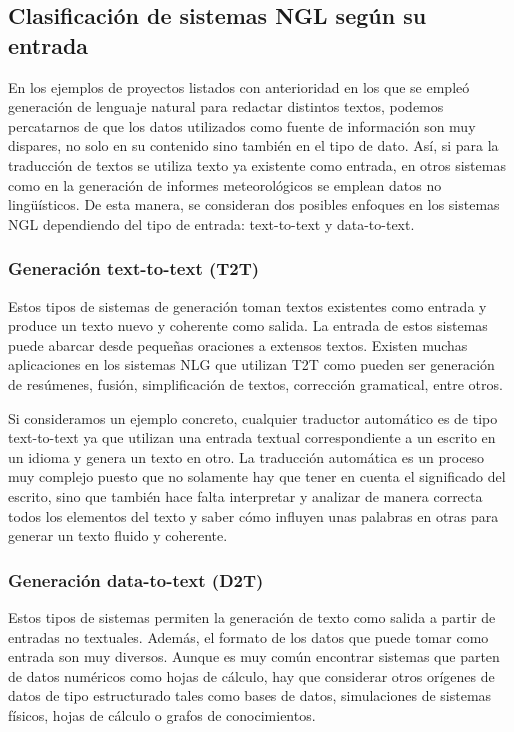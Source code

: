 \subsection{Clasificación de sistemas NGL según su entrada}\label{cap:ngltiposentrada}
En los ejemplos de proyectos listados con anterioridad en los que se empleó generación de lenguaje natural para redactar distintos textos, podemos percatarnos de que los datos utilizados como fuente de información son muy dispares, no solo en su contenido sino también en el tipo de dato. Así, si para la traducción de textos se utiliza texto ya existente como entrada, en otros sistemas como en la generación de informes meteorológicos se emplean datos no lingüísticos. De esta manera, se consideran dos posibles enfoques en los sistemas NGL dependiendo del tipo de entrada: text-to-text y data-to-text.


\subsubsection{Generación text-to-text (T2T)}
Estos tipos de sistemas de generación toman textos existentes como entrada y produce un texto nuevo y coherente como salida. La entrada de estos sistemas puede abarcar desde pequeñas oraciones a extensos textos. Existen muchas aplicaciones en los sistemas NLG que utilizan T2T como pueden ser generación de resúmenes, fusión, simplificación de textos, corrección gramatical, entre otros.

Si consideramos un ejemplo concreto, cualquier traductor automático es de tipo text-to-text ya que utilizan una entrada textual correspondiente a un escrito en un idioma y genera un texto en otro. La traducción automática es un proceso muy complejo puesto que no solamente hay que tener en cuenta el significado del escrito, sino que también hace falta interpretar y analizar de manera correcta todos los elementos del texto y saber cómo influyen unas palabras en otras para generar un texto fluido y coherente.

\subsubsection{Generación data-to-text (D2T)}
Estos tipos de sistemas permiten la generación de texto como salida a partir de entradas no textuales. Además, el formato de los datos que puede tomar como entrada son muy diversos. Aunque es muy común encontrar sistemas que parten de datos numéricos como hojas de cálculo, hay que considerar otros orígenes de datos de tipo estructurado tales como bases de datos, simulaciones de sistemas físicos, hojas de cálculo o grafos de conocimientos. 


